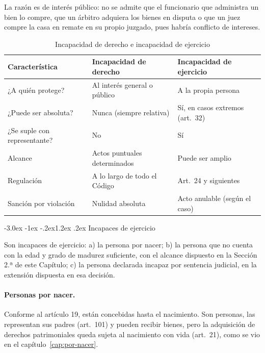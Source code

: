 \documentclass[12pt,oneside]{book}
\makeatletter
\renewcommand\section{\@startsection{section}{1}{\z@}%
  {-3.0ex \@plus -1ex \@minus -.2ex}{1.2ex \@plus .2ex}%
  {\normalfont\large\bfseries\color{acento}}}
\makeatother
\begin{document}
La razón es de interés público: no se admite que el funcionario que administra un bien lo compre, que un árbitro adquiera los bienes en disputa o que un juez compre la casa en remate en su propio juzgado, pues habría conflicto de intereses.

\begin{table}[H]
\centering
\begin{tabularx}{\textwidth}{B{0.26\textwidth} Y Y}
\toprule
\textbf{Característica} & \textbf{Incapacidad de derecho} & \textbf{Incapacidad de ejercicio} \\
\midrule
¿A quién protege? & Al interés general o público & A la propia persona \\
¿Puede ser absoluta? & Nunca (siempre relativa) & Sí, en casos extremos (art.~32) \\
¿Se suple con representante? & No & Sí \\
Alcance & Actos puntuales determinados & Puede ser amplio \\
Regulación & A lo largo de todo el Código & Art.~24 y siguientes \\
Sanción por violación & Nulidad absoluta & Acto anulable (según el caso) \\
\bottomrule
\end{tabularx}
\caption{Incapacidad de derecho e incapacidad de ejercicio}
\end{table}

\section{Incapaces de ejercicio}

\begin{regla}
Son incapaces de ejercicio: a) la persona por nacer; b) la persona que no cuenta con la edad y grado de madurez suficiente, con el alcance dispuesto en la Sección 2.ª de este Capítulo; c) la persona declarada incapaz por sentencia judicial, en la extensión dispuesta en esa decisión.
\end{regla}

\paragraph{Personas por nacer.} Conforme al artículo 19, están concebidas hasta el nacimiento. Son personas, las representan sus padres (art.~101) y pueden recibir bienes, pero la adquisición de derechos patrimoniales queda sujeta al nacimiento con vida (art.~21), como se vio en el capítulo~\ref{cap:por-nacer}.
\end{document}
